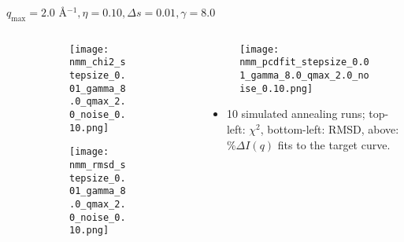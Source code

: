 \documentclass{beamer}
\begin{document}
\begin{frame}{$ q_{\textrm{max}}=2.0 $ \AA $^{-1}, \eta=0.10, \Delta s=0.01, \gamma=8.0$}
	\begin{columns}
		\begin{column}{.5\textwidth}
			\begin{figure}[H]
			\centering
			\begin{subfigure}[b]{\textwidth}
				\centering
				\texttt{[image: nmm\_chi2\_stepsize\_0.01\_gamma\_8.0\_qmax\_2.0\_noise\_0.10.png]}
				\label{fig:}
			\end{subfigure}
			\begin{subfigure}[b]{\textwidth}
				\centering
				\texttt{[image: nmm\_rmsd\_stepsize\_0.01\_gamma\_8.0\_qmax\_2.0\_noise\_0.10.png]}
				\label{fig:}
			\end{subfigure}
			\end{figure}
		\end{column}
		\begin{column}{.5\textwidth}
			\begin{figure}[H]
				\centering
				\texttt{[image: nmm\_pcdfit\_stepsize\_0.01\_gamma\_8.0\_qmax\_2.0\_noise\_0.10.png]}
				\label{fig:}
			\end{figure}
			\begin{itemize}
				\item 10 simulated annealing runs; top-left: $\chi^2$, bottom-left: RMSD, above: $\%\Delta I(q)$ fits to the target curve.
			\end{itemize}
		\end{column}
	\end{columns}
\end{frame}
 
\end{document}
